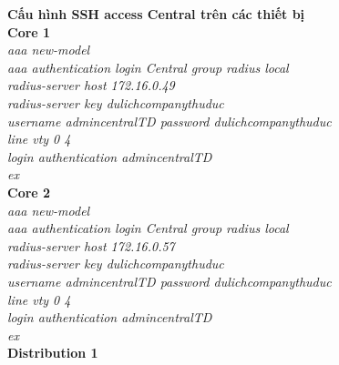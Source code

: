 \documentclass[a4paper, 12pt]{article}
\begin{document}
\hspace*{1cm} \textbf{Cấu hình SSH access Central trên các thiết bị}\\
\hspace*{1cm} \textbf{Core 1}\\
\hspace*{2cm}\textit{aaa new-model\\
\hspace*{2cm}aaa authentication login Central group radius local\\
\hspace*{2cm}radius-server host 172.16.0.49\\
\hspace*{2cm}radius-server key dulichcompanythuduc\\
\hspace*{2cm}username admincentralTD password dulichcompanythuduc\\
\hspace*{2cm}line vty 0 4\\
\hspace*{2cm}login authentication admincentralTD\\
\hspace*{2cm}ex\\}
\hspace*{1cm} \textbf{Core 2}\\
\hspace*{2cm}\textit{aaa new-model\\
\hspace*{2cm}aaa authentication login Central group radius local\\
\hspace*{2cm}radius-server host 172.16.0.57\\
\hspace*{2cm}radius-server key dulichcompanythuduc\\
\hspace*{2cm}username admincentralTD password dulichcompanythuduc\\
\hspace*{2cm}line vty 0 4\\
\hspace*{2cm}login authentication admincentralTD\\
\hspace*{2cm}ex\\}
\hspace*{1cm} \textbf{Distribution 1}\\
\end{document}

